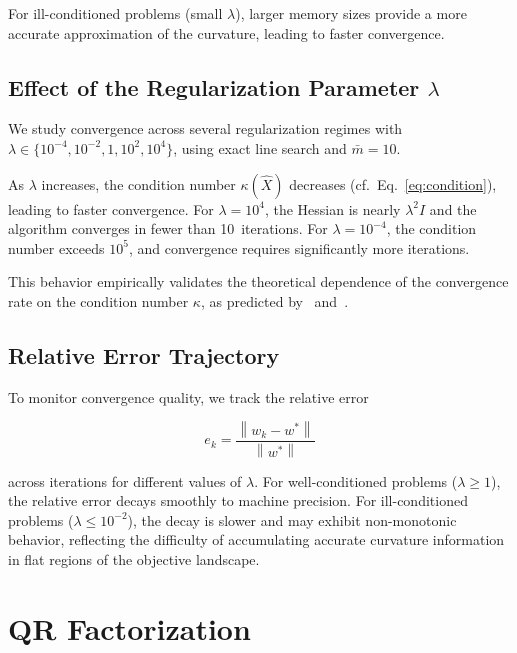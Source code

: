 \documentclass[11pt,a4paper]{article}
\newcommand{\norm}[1]{\left\|#1\right\|}
\newcommand{\Xhat}{\hat{X}}
\begin{document}
For ill-conditioned problems (small $\lambda$), larger memory sizes provide a more 
accurate approximation of the curvature, leading to faster convergence.



\subsection{Effect of the Regularization Parameter $\lambda$}
\label{sec:lambda_effect}

We study convergence across several regularization regimes with 
$\lambda \in \{10^{-4}, 10^{-2}, 1, 10^2, 10^4\}$, using exact line search and 
$\bar{m} = 10$.

As $\lambda$ increases, the condition number $\kappa(\Xhat)$ decreases 
(cf.\ Eq.~\eqref{eq:condition}), leading to faster convergence. For $\lambda = 10^4$, 
the Hessian is nearly $\lambda^2 I$ and the algorithm converges in fewer than 10~iterations. 
For $\lambda = 10^{-4}$, the condition number exceeds $10^5$, and convergence requires 
significantly more iterations.

This behavior empirically validates the theoretical dependence of the convergence rate 
on the condition number $\kappa$, as predicted by~\cite{rodomanov2021} and~\cite{jin2022}.



\subsection{Relative Error Trajectory}

To monitor convergence quality, we track the relative error

\begin{equation}
    e_k = \frac{\norm{w_k - w^*}}{\norm{w^*}}
\end{equation}

across iterations for different values of $\lambda$. For well-conditioned problems 
($\lambda \geq 1$), the relative error decays smoothly to machine precision. 
For ill-conditioned problems ($\lambda \leq 10^{-2}$), the decay is slower and may 
exhibit non-monotonic behavior, reflecting the difficulty of accumulating accurate 
curvature information in flat regions of the objective landscape.


\section{QR Factorization}
\label{sec:qr}
\end{document}
